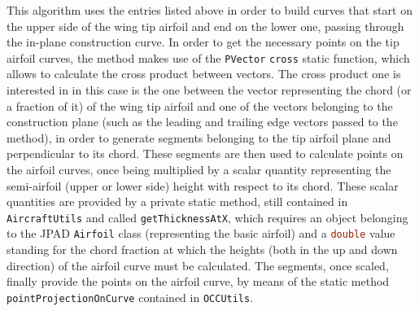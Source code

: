 This algorithm uses the entries listed above in order to build curves that start on the upper side of the wing tip airfoil and end on the lower one, passing through the in-plane construction curve. In order to get the necessary points on the tip airfoil curves, the method makes use of the \lstinline[language=Java]!PVector! \lstinline[language=Java]!cross! static function, which allows to calculate the cross product between vectors. The cross product one is interested in in this case is the one between the vector representing the chord (or a fraction of it) of the wing tip airfoil and one of the vectors belonging to the construction plane (such as the leading and trailing edge vectors passed to the method), in order to generate segments belonging to the tip airfoil plane and perpendicular to its chord. These segments are then used to calculate points on the airfoil curves, once being multiplied by a scalar quantity representing the semi-airfoil (upper or lower side) height with respect to its chord. These scalar quantities are provided by a private static method, still contained in \lstinline[language=Java]!AircraftUtils! and called \lstinline[language=Java]!getThicknessAtX!, which requires an object belonging to the \gls{JPAD} \lstinline[language=Java]!Airfoil! class (representing the basic airfoil) and a \lstinline[language=Java]!double! value standing for the chord fraction at which the heights (both in the up and down direction) of the airfoil curve must be calculated. The segments, once scaled, finally provide the points on the airfoil curve, by means of the static method \lstinline[language=Java]!pointProjectionOnCurve! contained in \lstinline[language=Java]!OCCUtils!. 

